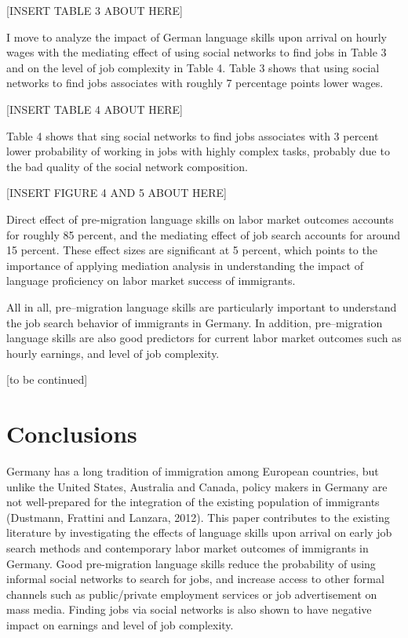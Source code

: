 \documentclass[12pt,a4paper]{article}
\begin{document}
\begin{center}
[INSERT TABLE 3 ABOUT HERE]
\end{center}

I move to analyze the impact of German language skills upon arrival on hourly wages with the mediating effect of using social networks to find jobs in Table 3 and on the level of job complexity in Table 4. Table 3 shows that using social networks to find jobs associates with roughly 7 percentage points lower wages.

\begin{center}
[INSERT TABLE 4 ABOUT HERE]
\end{center}
Table 4 shows that sing social networks to find jobs associates with 3 percent lower probability of working in jobs with highly complex tasks, probably due to the bad quality of the social network composition. 

\begin{center}
[INSERT FIGURE 4 AND 5 ABOUT HERE]
\end{center}

Direct effect of pre-migration language skills on labor market outcomes accounts for roughly 85 percent, and the mediating effect of job search accounts for around 15 percent. These effect sizes are significant at 5 percent, which points to the importance of applying mediation analysis in understanding the impact of language proficiency on labor market success of immigrants. 

All in all, pre--migration language skills are particularly important to understand the job search behavior of immigrants in Germany. In addition, pre--migration language skills are also good predictors for current labor market outcomes such as hourly earnings, and level of job complexity.

\begin{center}
[to be continued]
\end{center} 

\section{Conclusions}

Germany has a long tradition of immigration among European countries, but unlike the United States, Australia and Canada, policy makers in Germany are not well-prepared for the integration of the existing population of immigrants (Dustmann, Frattini and Lanzara, 2012). This paper contributes to the existing literature by investigating the effects of language skills upon arrival on early job search methods and contemporary labor market outcomes of immigrants in Germany. Good pre-migration language skills reduce the probability of using informal social networks to search for jobs, and increase access to other formal channels such as public/private employment services or job advertisement on mass media. Finding jobs via social networks is also shown to have negative impact on earnings and level of job complexity.
\end{document}
